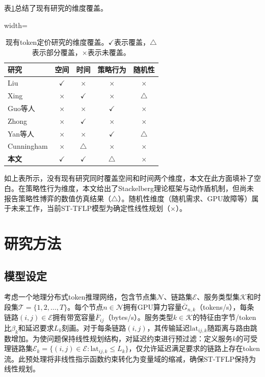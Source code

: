 \documentclass[11pt,a4paper,twocolumn]{article}
\begin{document}
表\ref{tab:lit_summary}总结了现有研究的维度覆盖。

\begin{table}[htbp]
\centering
\caption{现有token定价研究的维度覆盖。$\checkmark$表示覆盖，$\triangle$表示部分覆盖，$\times$表示未覆盖。}
\label{tab:lit_summary}
\scriptsize
\begin{adjustbox}{width=\columnwidth}
\begin{tabular}{p{2.2cm}cccc}
\toprule
\textbf{研究} & \textbf{空间} & \textbf{时间} & \textbf{策略行为} & \textbf{随机性} \\
\midrule
Liu\cite{liu2026locational} & $\checkmark$ & $\times$ & $\times$ & $\times$ \\
Xing\cite{xing2026tokenfutures} & $\times$ & $\checkmark$ & $\times$ & $\triangle$ \\
Guo等人\cite{guo2025prilm} & $\times$ & $\times$ & $\checkmark$ & $\times$ \\
Zhong\cite{zhong2026token} & $\times$ & $\checkmark$ & $\times$ & $\times$ \\
Yan等人\cite{yan2026stackelberg} & $\times$ & $\times$ & $\checkmark$ & $\triangle$ \\
Cunningham\cite{cunningham2026token} & $\times$ & $\triangle$ & $\times$ & $\times$ \\
\textbf{本文} & $\checkmark$ & $\checkmark$ & $\triangle$ & $\times$ \\
\bottomrule
\end{tabular}
\end{adjustbox}
\end{table}

如上表所示，没有现有研究同时覆盖空间和时间两个维度，本文在此方面填补了空白。在策略性行为维度，本文给出了Stackelberg理论框架与动作盾机制，但尚未报告策略性博弈的数值仿真结果（$\triangle$）。随机性维度（随机需求、GPU故障等）属于未来工作，当前ST-TFLP模型为确定性线性规划（$\times$）。

\section{研究方法}

\subsection{模型设定}

考虑一个地理分布式token推理网络，包含节点集$\mathcal{N}$、链路集$\mathcal{E}$、服务类型集$\mathcal{K}$和时段集$\mathcal{T} = \{1, 2, \ldots, T\}$。每个节点$n \in \mathcal{N}$拥有GPU算力容量$\overline{G}_{n,k}$（tokens/s），每条链路$(i,j) \in \mathcal{E}$拥有带宽容量$\overline{F}_{ij}$（bytes/s）。服务类型$k \in \mathcal{K}$的特征由字节/token比$\beta_k$和延迟要求$L_k$刻画。对于每条链路$(i,j)$，其传输延迟$\text{lat}_{ij,k}$随距离与路由跳数增加。为使问题保持线性规划结构，对延迟约束进行预过滤：定义服务$k$的可受理链路集$\mathcal{E}_k = \{(i,j) \in \mathcal{E} : \text{lat}_{ij,k} \leq L_k\}$，仅允许延迟满足要求的链路上存在token流。此预处理将非线性指示函数约束转化为变量域的缩减，确保ST-TFLP保持为线性规划。
\end{document}
